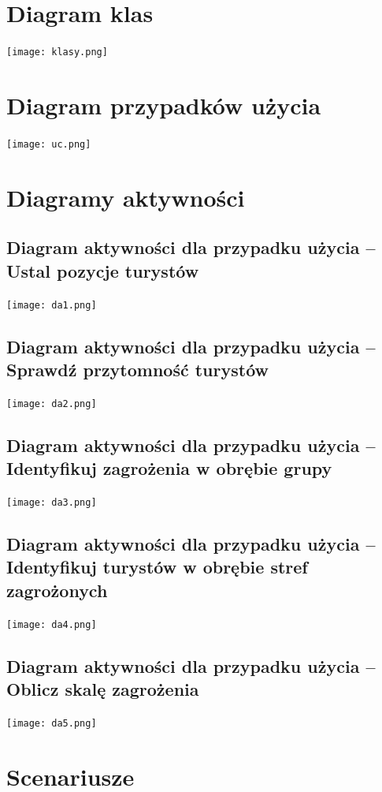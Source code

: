 \documentclass[a4paper,12pt]{article}
\begin{document}
\section{Diagram klas}
\begin{center}
\texttt{[image: klasy.png]}
\end{center}
\section{Diagram przypadków użycia}
\texttt{[image: uc.png]}
\section{Diagramy aktywności}
\subsection{Diagram aktywności dla przypadku użycia -- Ustal pozycje turystów}
\begin{center}
\texttt{[image: da1.png]}
\end{center}
\newpage
\subsection{Diagram aktywności dla przypadku użycia -- Sprawdź przytomność turystów}
\texttt{[image: da2.png]}
\newpage
\subsection{Diagram aktywności dla przypadku użycia -- Identyfikuj zagrożenia w obrębie grupy}
\texttt{[image: da3.png]}
\newpage
\subsection{Diagram aktywności dla przypadku użycia -- Identyfikuj turystów w obrębie stref zagrożonych}
\texttt{[image: da4.png]}
\newpage
\subsection{Diagram aktywności dla przypadku użycia -- Oblicz skalę zagrożenia}
\texttt{[image: da5.png]}
\section{Scenariusze}
\end{document}
